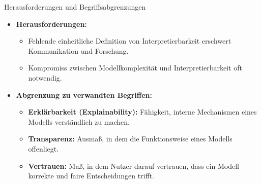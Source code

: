 \documentclass[aspectratio=1610, xcolor=dvipsnames, 9pt]{beamer}
\begin{document}
\begin{frame}{Herausforderungen und Begriffsabgrenzungen}
    \begin{itemize}
        \item \textbf{Herausforderungen:}
        \begin{itemize}
            \item Fehlende einheitliche Definition von Interpretierbarkeit erschwert Kommunikation und Forschung.
            \item Kompromiss zwischen Modellkomplexität und Interpretierbarkeit oft notwendig.
        \end{itemize}
        \item \textbf{Abgrenzung zu verwandten Begriffen:}
        \begin{itemize}
            \item \textbf{Erklärbarkeit (Explainability):} \newline
            Fähigkeit, interne Mechanismen eines Modells verständlich zu machen.
            \item \textbf{Transparenz:} \newline
            Ausmaß, in dem die Funktionsweise eines Modells offenliegt.
            \item \textbf{Vertrauen:} \newline
            Maß, in dem Nutzer darauf vertrauen, dass ein Modell korrekte und faire Entscheidungen trifft.
        \end{itemize}
    \end{itemize}
\end{frame}
\end{document}
